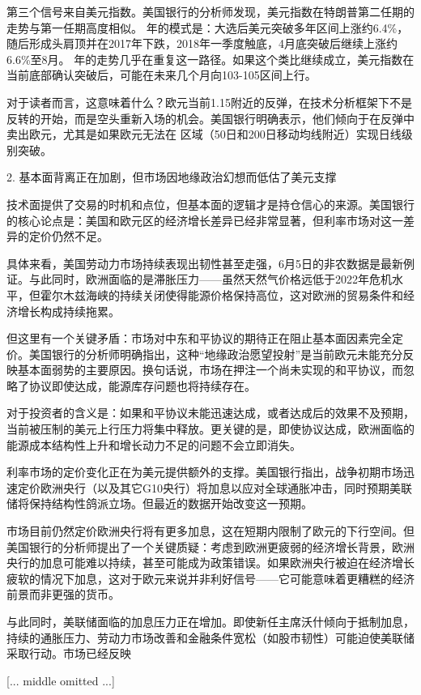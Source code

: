 \documentclass[11pt]{ctexart}
\begin{document}
第三个信号来自美元指数。美国银行的分析师发现，美元指数在特朗普第二任期的走势与第一任期高度相似。 年的模式是：大选后美元突破多年区间上涨约6.4\%，随后形成头肩顶并在2017年下跌，2018年一季度触底，4月底突破后继续上涨约6.6\%至8月。 年的走势几乎在重复这一路径。如果这个类比继续成立，美元指数在当前底部确认突破后，可能在未来几个月向103-105区间上行。

对于读者而言，这意味着什么？欧元当前1.15附近的反弹，在技术分析框架下不是反转的开始，而是空头重新入场的机会。美国银行明确表示，他们倾向于在反弹中卖出欧元，尤其是如果欧元无法在 区域（50日和200日移动均线附近）实现日线级别突破。

2. 基本面背离正在加剧，但市场因地缘政治幻想而低估了美元支撑

技术面提供了交易的时机和点位，但基本面的逻辑才是持仓信心的来源。美国银行的核心论点是：美国和欧元区的经济增长差异已经非常显著，但利率市场对这一差异的定价仍然不足。

具体来看，美国劳动力市场持续表现出韧性甚至走强，6月5日的非农数据是最新例证。与此同时，欧洲面临的是滞胀压力——虽然天然气价格远低于2022年危机水平，但霍尔木兹海峡的持续关闭使得能源价格保持高位，这对欧洲的贸易条件和经济增长构成持续拖累。

但这里有一个关键矛盾：市场对中东和平协议的期待正在阻止基本面因素完全定价。美国银行的分析师明确指出，这种“地缘政治愿望投射”是当前欧元未能充分反映基本面弱势的主要原因。换句话说，市场在押注一个尚未实现的和平协议，而忽略了协议即使达成，能源库存问题也将持续存在。

对于投资者的含义是：如果和平协议未能迅速达成，或者达成后的效果不及预期，当前被压制的美元上行压力将集中释放。更关键的是，即使协议达成，欧洲面临的能源成本结构性上升和增长动力不足的问题不会立即消失。

利率市场的定价变化正在为美元提供额外的支撑。美国银行指出，战争初期市场迅速定价欧洲央行（以及其它G10央行）将加息以应对全球通胀冲击，同时预期美联储将保持结构性鸽派立场。但最近的数据开始改变这一预期。

市场目前仍然定价欧洲央行将有更多加息，这在短期内限制了欧元的下行空间。但美国银行的分析师提出了一个关键质疑：考虑到欧洲更疲弱的经济增长背景，欧洲央行的加息可能难以持续，甚至可能成为政策错误。如果欧洲央行被迫在经济增长疲软的情况下加息，这对于欧元来说并非利好信号——它可能意味着更糟糕的经济前景而非更强的货币。

与此同时，美联储面临的加息压力正在增加。即使新任主席沃什倾向于抵制加息，持续的通胀压力、劳动力市场改善和金融条件宽松（如股市韧性）可能迫使美联储采取行动。市场已经反映

[... middle omitted ...]
\end{document}
